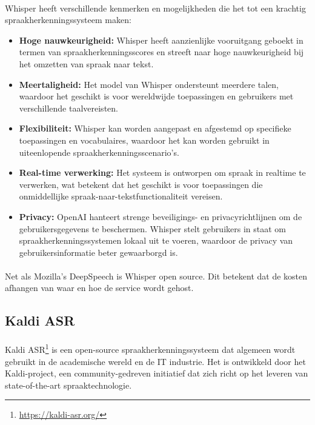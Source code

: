 \paragraph{}
Whisper heeft verschillende kenmerken en mogelijkheden die het tot een krachtig spraakherkenningssysteem maken:

\begin{itemize}
    \item \textbf{Hoge nauwkeurigheid:} Whisper heeft aanzienlijke vooruitgang geboekt in termen van spraakherkenningsscores en streeft naar hoge nauwkeurigheid bij het omzetten van spraak naar tekst.

    \item \textbf{Meertaligheid:} Het model van Whisper ondersteunt meerdere talen, waardoor het geschikt is voor wereldwijde toepassingen en gebruikers met verschillende taalvereisten.

    \item \textbf{Flexibiliteit:} Whisper kan worden aangepast en afgestemd op specifieke toepassingen en vocabulaires, waardoor het kan worden gebruikt in uiteenlopende spraakherkenningsscenario's.

    \item \textbf{Real-time verwerking:} Het systeem is ontworpen om spraak in realtime te verwerken, wat betekent dat het geschikt is voor toepassingen die onmiddellijke spraak-naar-tekstfunctionaliteit vereisen.

    \item \textbf{Privacy:} OpenAI hanteert strenge beveiligings- en privacyrichtlijnen om de gebruikersgegevens te beschermen. Whisper stelt gebruikers in staat om spraakherkenningssystemen lokaal uit te voeren, waardoor de privacy van gebruikersinformatie beter gewaarborgd is.
\end{itemize}

\paragraph{}
Net als Mozilla's DeepSpeech is Whisper open source. Dit betekent dat de kosten afhangen van waar en hoe de service wordt gehost.

\subsection{Kaldi ASR}

\paragraph{}
Kaldi ASR\footnote{\href{https://kaldi-asr.org/}{https://kaldi-asr.org/}} is een open-source spraakherkenningssysteem dat algemeen wordt gebruikt in de academische wereld en de IT industrie. Het is ontwikkeld door het Kaldi-project, een community-gedreven initiatief dat zich richt op het leveren van state-of-the-art spraaktechnologie.

